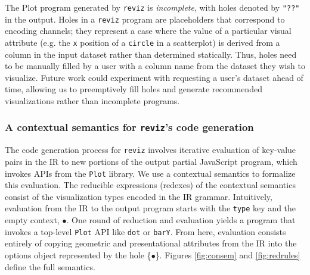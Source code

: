 \documentclass[acmsmall,screen,nonacm]{acmart}
\newcommand{\code}[1]{\texttt{#1}}
\begin{document}
The Plot program generated by \code{reviz} is \emph{incomplete}, with holes denoted by \code{"??"} in the output. Holes in a \code{reviz} program are placeholders that correspond to encoding channels; they represent a case where the value of a particular visual attribute (e.g. the \code{x} position of a \code{circle} in a scatterplot) is derived from a column in the input dataset rather than determined statically. Thus, holes need to be manually filled by a user with a column name from the dataset they wish to visualize. Future work could experiment with requesting a user's dataset ahead of time, allowing us to preemptively fill holes and generate recommended visualizations rather than incomplete programs.

\subsubsection{A contextual semantics for \code{reviz}'s code generation}

The code generation process for \code{reviz} involves iterative evaluation of key-value pairs in the IR to new portions of the output partial JavaScript program, which invokes APIs from the \code{Plot} library. We use a contextual semantics to formalize this evaluation. The reducible expressions (redexes) of the contextual semantics consist of the visualization types encoded in the IR grammar. Intuitively, evaluation from the IR to the output program starts with the \code{type} key and the empty context, $\bullet$. One round of reduction and evaluation yields a program that invokes a top-level \code{Plot} API like \code{dot} or \code{barY}. From here, evaluation consists entirely of copying geometric and presentational attributes from the IR into the options object represented by the hole \{$\bullet$\}. Figures \ref{fig:consem} and \ref{fig:redrules} define the full semantics.
\end{document}
